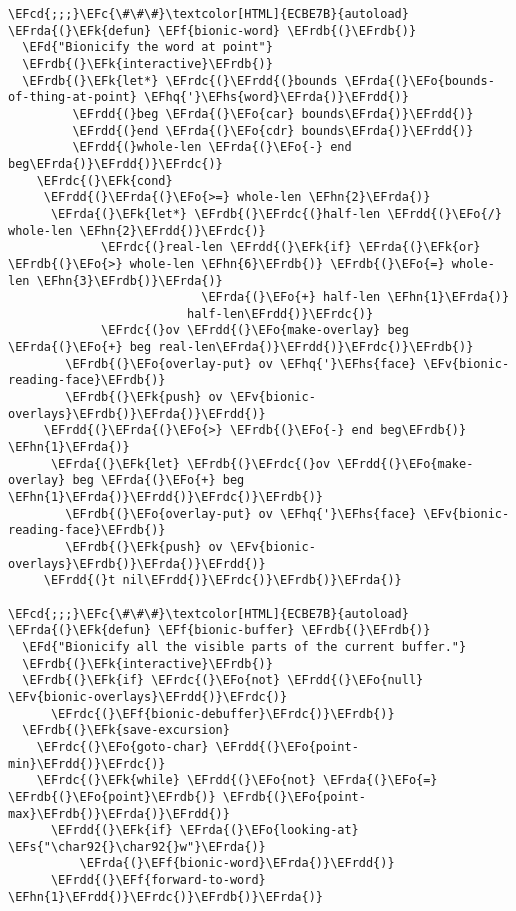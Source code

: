 \documentclass[a4wide,10pt]{article}
\newcommand{\EFc}[1]{\textcolor{EFc}{#1}} %
\newcommand{\EFcd}[1]{\textcolor{EFcd}{#1}} %
\newcommand{\EFs}[1]{\textcolor{EFs}{#1}} %
\newcommand{\EFd}[1]{\textcolor{EFd}{#1}} %
\newcommand{\EFk}[1]{\textcolor{EFk}{#1}} %
\newcommand{\EFf}[1]{\textcolor{EFf}{#1}} %
\newcommand{\EFv}[1]{\textcolor{EFv}{#1}} %
\newcommand{\EFo}[1]{\textcolor{EFo}{#1}} %
\newcommand{\EFhn}[1]{\textcolor{EFhn}{\textbf{#1}}} %
\newcommand{\EFhq}[1]{\textcolor{EFhq}{#1}} %
\newcommand{\EFhs}[1]{\textcolor{EFhs}{#1}} %
\newcommand{\EFrda}[1]{\textcolor{EFrda}{#1}} %
\newcommand{\EFrdb}[1]{\textcolor{EFrdb}{#1}} %
\newcommand{\EFrdc}[1]{\textcolor{EFrdc}{#1}} %
\newcommand{\EFrdd}[1]{\textcolor{EFrdd}{#1}} %
\begin{document}
\begin{Code}
\begin{Verbatim}
\EFcd{;;;}\EFc{\#\#\#}\textcolor[HTML]{ECBE7B}{autoload}
\EFrda{(}\EFk{defun} \EFf{bionic-word} \EFrdb{(}\EFrdb{)}
  \EFd{"Bionicify the word at point"}
  \EFrdb{(}\EFk{interactive}\EFrdb{)}
  \EFrdb{(}\EFk{let*} \EFrdc{(}\EFrdd{(}bounds \EFrda{(}\EFo{bounds-of-thing-at-point} \EFhq{'}\EFhs{word}\EFrda{)}\EFrdd{)}
         \EFrdd{(}beg \EFrda{(}\EFo{car} bounds\EFrda{)}\EFrdd{)}
         \EFrdd{(}end \EFrda{(}\EFo{cdr} bounds\EFrda{)}\EFrdd{)}
         \EFrdd{(}whole-len \EFrda{(}\EFo{-} end beg\EFrda{)}\EFrdd{)}\EFrdc{)}
    \EFrdc{(}\EFk{cond}
     \EFrdd{(}\EFrda{(}\EFo{>=} whole-len \EFhn{2}\EFrda{)}
      \EFrda{(}\EFk{let*} \EFrdb{(}\EFrdc{(}half-len \EFrdd{(}\EFo{/} whole-len \EFhn{2}\EFrdd{)}\EFrdc{)}
             \EFrdc{(}real-len \EFrdd{(}\EFk{if} \EFrda{(}\EFk{or} \EFrdb{(}\EFo{>} whole-len \EFhn{6}\EFrdb{)} \EFrdb{(}\EFo{=} whole-len \EFhn{3}\EFrdb{)}\EFrda{)}
                           \EFrda{(}\EFo{+} half-len \EFhn{1}\EFrda{)}
                         half-len\EFrdd{)}\EFrdc{)}
             \EFrdc{(}ov \EFrdd{(}\EFo{make-overlay} beg \EFrda{(}\EFo{+} beg real-len\EFrda{)}\EFrdd{)}\EFrdc{)}\EFrdb{)}
        \EFrdb{(}\EFo{overlay-put} ov \EFhq{'}\EFhs{face} \EFv{bionic-reading-face}\EFrdb{)}
        \EFrdb{(}\EFk{push} ov \EFv{bionic-overlays}\EFrdb{)}\EFrda{)}\EFrdd{)}
     \EFrdd{(}\EFrda{(}\EFo{>} \EFrdb{(}\EFo{-} end beg\EFrdb{)} \EFhn{1}\EFrda{)}
      \EFrda{(}\EFk{let} \EFrdb{(}\EFrdc{(}ov \EFrdd{(}\EFo{make-overlay} beg \EFrda{(}\EFo{+} beg \EFhn{1}\EFrda{)}\EFrdd{)}\EFrdc{)}\EFrdb{)}
        \EFrdb{(}\EFo{overlay-put} ov \EFhq{'}\EFhs{face} \EFv{bionic-reading-face}\EFrdb{)}
        \EFrdb{(}\EFk{push} ov \EFv{bionic-overlays}\EFrdb{)}\EFrda{)}\EFrdd{)}
     \EFrdd{(}t nil\EFrdd{)}\EFrdc{)}\EFrdb{)}\EFrda{)}

\EFcd{;;;}\EFc{\#\#\#}\textcolor[HTML]{ECBE7B}{autoload}
\EFrda{(}\EFk{defun} \EFf{bionic-buffer} \EFrdb{(}\EFrdb{)}
  \EFd{"Bionicify all the visible parts of the current buffer."}
  \EFrdb{(}\EFk{interactive}\EFrdb{)}
  \EFrdb{(}\EFk{if} \EFrdc{(}\EFo{not} \EFrdd{(}\EFo{null} \EFv{bionic-overlays}\EFrdd{)}\EFrdc{)}
      \EFrdc{(}\EFf{bionic-debuffer}\EFrdc{)}\EFrdb{)}
  \EFrdb{(}\EFk{save-excursion}
    \EFrdc{(}\EFo{goto-char} \EFrdd{(}\EFo{point-min}\EFrdd{)}\EFrdc{)}
    \EFrdc{(}\EFk{while} \EFrdd{(}\EFo{not} \EFrda{(}\EFo{=} \EFrdb{(}\EFo{point}\EFrdb{)} \EFrdb{(}\EFo{point-max}\EFrdb{)}\EFrda{)}\EFrdd{)}
      \EFrdd{(}\EFk{if} \EFrda{(}\EFo{looking-at} \EFs{"\char92{}\char92{}w"}\EFrda{)}
          \EFrda{(}\EFf{bionic-word}\EFrda{)}\EFrdd{)}
      \EFrdd{(}\EFf{forward-to-word} \EFhn{1}\EFrdd{)}\EFrdc{)}\EFrdb{)}\EFrda{)}


\end{Verbatim}
\end{Code}
\end{document}
